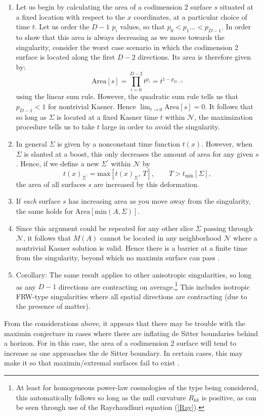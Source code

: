 \documentclass[12pt]{article}
\begin{document}
\begin{enumerate}[resume]
\begin{enumerate}
	\item Let us begin by calculating the area of a codimension 2 surface $s$ situated at a fixed
location with respect to the $x$ coordinates, at a particular choice of time $t$.  Let us order the $D-1$ $p_i$ values, so that $p_0 < p_1 \ldots < p_{D-1}$.  In order to show that this area is always decreasing as we move towards the singularity, consider the worst case scenario in which the codimension 2 surface is located along the first $D-2$ directions.  Its area is therefore given by:
\begin{equation}
\mathrm{Area}[s] = \prod_{i = 0}^{D-2} t^{p_i} = t^{1 - p_{D-1}}
\end{equation}
using the linear sum rule.  However, the quadratic sum rule tells us that $p_{D-1} < 1$ for nontrivial Kasner.  Hence $\lim_{t \to 0} \mathrm{Area}[s] = 0$.  It follows that so long as $\Sigma$ is located at a fixed Kasner time $t$ within $\mathcal{N}$, the maximization procedure tells us to take $t$ large in order to avoid the singularity.
	\item In general $\Sigma$ is given by a nonconstant time function $t(x)$.  However, when $\Sigma$ is slanted at a boost, this only decreases the amount of area for any given $s$.  Hence, if we define a new $\Sigma^\prime$ within $\mathcal{N}$ by
\begin{equation}
t(x)_{\Sigma^\prime} = \mathrm{max}[t(x)_\Sigma,\,T], \qquad T > t_\mathrm{min}[\Sigma],
\end{equation}
the area of all surfaces $s$ are increased by this deformation.
	\item If \emph{each} surface $s$ has increasing area as you move away from the singularity, the same holds for $\mathrm{Area}[\mathrm{min}(A,\Sigma)]$.
	\item Since this argument could be repeated for any other slice $\Sigma$ passing through $\mathcal{N}$, it follows that $M(A)$ cannot be located in any neighborhood $\mathcal{N}$ where a nontrivial Kasner solution is valid.  Hence there is a barrier at a finite time from the singularity, beyond which no maximin surface can pass \cite{barriers}.
	\item Corollary: The same result applies to other anisotropic singularities, so long as any $D-1$ directions are contracting on average.\footnote{At least for homogeneous power-law cosmologies of the type being considered, this automatically follows so long as the null curvature $R_{kk}$ is positive, as can be seen through use of the Raychaudhuri equation (\ref{Ray}).} This includes isotropic FRW-type singularities where all spatial directions are contracting (due to the presence of matter).
	\end{enumerate}
\end{enumerate}
From the considerations above, it appears that there may be trouble with the maximin conjecture in cases where there are inflating de Sitter boundaries behind a horizon.  For in this case, the area of a codimension 2 surface will tend to increase as one approaches the de Sitter boundary.  In certain cases, this may make it so that maximin/extremal surfaces fail to exist \cite{FM14}.
\end{document}
